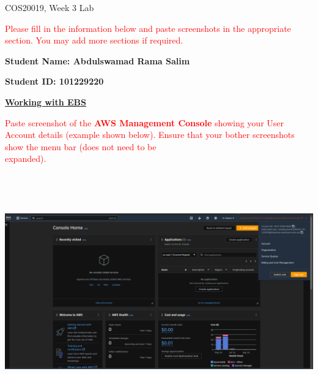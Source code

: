 \documentclass[11pt]{article}
\begin{document}
\noindent COS20019, Week 3 Lab

\vspace{0.8cm}

\noindent\textcolor{red}{Please fill in the information below and paste screenshots in the appropriate section. You may add more sections if required.}

\vspace{0.4cm}

\noindent\textbf{Student Name: Abdulswamad Rama Salim} 

\vspace{0.45cm}

\noindent\textbf{Student ID\@: 101229220}

\vspace{1.2cm}

\noindent\underline{\textbf{Working with EBS}}

\vspace{0.6cm}

\noindent\textcolor{red}{Paste screenshot of the \textbf{AWS Management Console} showing your User Account details (example shown below). Ensure that your bother screenshots show the menu bar (does not need to be\\ expanded).}

\vspace{0.6cm}


{\centering
\includegraphics[width=6.2in, height=4.0in]{pics/0.png}}
\end{document}

